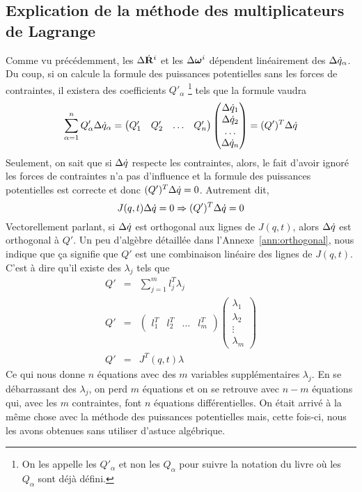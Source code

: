 \subsection{Explication de la méthode des multiplicateurs de Lagrange}
Comme vu précédemment, les $\Delta \dot{\bf R}^i$ et les $\Delta {\bm \omega}^i$ dépendent linéairement des $\Delta \dot{q}_\alpha$.
Du coup, si on calcule la formule des puissances potentielles sans les forces de contraintes, il existera des coefficients $Q'_\alpha$
\footnote{On les appelle les $Q'_\alpha$ et non les $Q_\alpha$ pour suivre la notation du livre où les $Q_\alpha$ sont déjà défini.}
tels que la formule vaudra
\[ \sum_{\alpha = 1}^n Q'_\alpha \Delta \dot{q}_\alpha =
\begin{pmatrix}Q'_1 & Q'_2 & \ldots & Q'_n\end{pmatrix}\begin{pmatrix}\Delta \dot{q}_1\\\Delta \dot{q}_2\\\ldots\\\Delta \dot{q}_n\end{pmatrix}
= (Q')^T \Delta \dot{q} \]
Seulement, on sait que si $\Delta \dot{q}$ respecte les contraintes, alors, le fait d'avoir ignoré les forces de contraintes n'a pas d'influence et la formule des puissances potentielles est correcte et donc $(Q')^T \Delta \dot{q} = 0$.
Autrement dit,
\[ J(q, t) \Delta \dot{q} = 0 \Rightarrow (Q')^T \Delta \dot{q} = 0 \]
Vectorellement parlant, si $\Delta \dot{q}$ est orthogonal aux lignes de $J(q, t)$, alors $\Delta \dot{q}$ est orthogonal à $Q'$.
Un peu d'algèbre détaillée dans l'Annexe~\ref{ann:orthogonal}, nous indique que ça signifie que $Q'$ est une combinaison linéaire des lignes de $J(q, t)$.
C'est à dire qu'il existe des $\lambda_j$ tels que
\begin{eqnarray*}
	Q' &=& \sum_{j = 1}^m l_j^T \lambda_j\\
	Q' &=& \begin{pmatrix}l_1^T&l_2^T&\ldots&l_m^T\end{pmatrix} \begin{pmatrix}\lambda_1\\\lambda_2\\\vdots\\\lambda_m\end{pmatrix}\\
	Q' &=& J^T(q, t) \lambda
\end{eqnarray*}
Ce qui nous donne $n$ équations avec des $m$ variables supplémentaires $\lambda_j$.
En se débarrassant des $\lambda_j$, on perd $m$ équations et on se retrouve avec $n - m$ équations qui, avec les $m$ contraintes, font $n$ équations différentielles.
On était arrivé à la même chose avec la méthode des puissances potentielles mais, cette fois-ci, nous les avons obtenues sans utiliser d'astuce algébrique.


